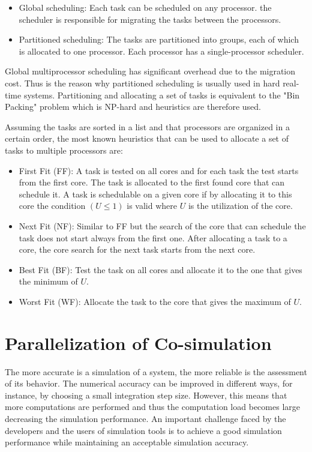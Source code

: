 \begin{itemize}
\item Global scheduling: Each task can be scheduled on any processor. the scheduler is responsible for migrating the tasks between the processors.
\item Partitioned scheduling: The tasks are partitioned into groups, each of which is allocated to one processor. Each processor has a single-processor scheduler. 
\end{itemize}
Global multiprocessor scheduling has significant overhead due to the migration cost. Thus is the reason why partitioned scheduling is usually used in hard real-time systems. Partitioning and allocating a set of tasks is equivalent to the "Bin Packing" problem which is NP-hard and heuristics are therefore used. 

Assuming the tasks are sorted in a list and that processors are organized in a certain order, the most known heuristics that can be used to allocate a set of tasks to multiple processors are:

\begin{itemize}
\item First Fit (FF): A task is tested on all cores and for each task the test starts from the first core. The task is allocated to the first found core that can schedule it. A task is schedulable on a given core if by allocating it to this core the condition $(U\leq1)$ is valid where $U$ is the utilization of the core.
\item Next Fit (NF): Similar to FF but the search of the core that can schedule the task does not start always from the first one. After allocating a task to a core, the core search for the next task starts from the next core.
\item Best Fit (BF): Test the task on all cores and allocate it to the one that gives the minimum of $U$.
\item Worst Fit (WF): Allocate the task to the core that gives the maximum of $U$.
\end{itemize}
  
\section{Parallelization of Co-simulation}

The more accurate is a simulation of a system, the more reliable is the assessment of its behavior. The numerical accuracy can be improved in different ways, for instance, by choosing a small integration step size. However, this means that more computations are performed and thus the computation load becomes large decreasing the simulation performance. An important challenge faced by the developers and the users of simulation tools is to achieve a good simulation performance while maintaining an acceptable simulation accuracy. 

